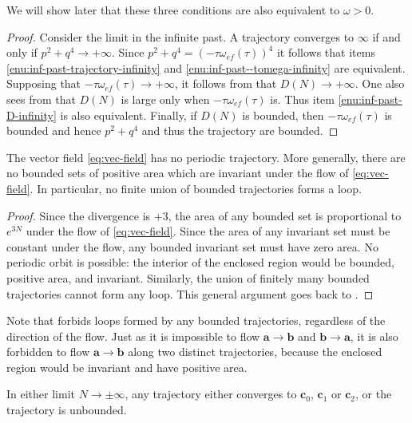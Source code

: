 We will show later that these three conditions are also equivalent to $\omega>0$. 
\begin{proof}
Consider the limit in the infinite past. A trajectory converges to $\bm{\infty}$ if and only if $p^{2}+q^{4}\to+\infty$. Since $p^{2}+q^{4}=(-\tau\omega_{ef}(\tau))^{4}$ it follows that items \ref{enu:inf-past-trajectory-infinity} and \ref{enu:inf-past--tomega-infinity} are equivalent. Supposing that $-\tau\omega_{ef}(\tau)\to+\infty$, it follows from  that $D(N)\to+\infty$. One also sees from  that $D(N)$ is large only when $-\tau\omega_{ef}(\tau)$ is. Thus item \ref{enu:inf-past-D-infinity} is also equivalent. Finally, if $D(N)$ is bounded, then $-\tau\omega_{ef}(\tau)$ is bounded and hence $p^{2}+q^{4}$ and thus the trajectory are bounded.
\end{proof}
\begin{lem}
\label{lem:Bendixson-criterion}The vector field \eqref{eq:vec-field} has no periodic trajectory. More generally, there are no bounded sets of positive area which are invariant under the flow of \eqref{eq:vec-field}. In particular, no finite union of bounded trajectories forms a loop.
\end{lem}

\begin{proof}
Since the divergence is $+3$, the area of any bounded set is proportional to $e^{3N}$ under the flow of \eqref{eq:vec-field}. Since the area of any invariant set must be constant under the flow, any bounded invariant set must have zero area. No periodic orbit is possible: the interior of the enclosed region would be bounded, positive area, and invariant. Similarly, the union of finitely many bounded trajectories cannot form any loop. This general argument goes back to \cite{bendixson1901}. 
\end{proof}
Note that  forbids loops formed by any bounded trajectories, regardless of the direction of the flow. Just as it is impossible to flow $\mathbf{a}\to\mathbf{b}$ and $\mathbf{b}\to\mathbf{a}$, it is also forbidden to flow $\mathbf{a}\to\mathbf{b}$ along two distinct trajectories, because the enclosed region would be invariant and have positive area. 
\begin{lem}
\label{lem:Poincare-Bendixson} In either limit $N\to\pm\infty$, any trajectory either converges to $\mathbf{c}_{0}$, $\mathbf{c}_{1}$ or $\mathbf{c}_{2}$, or the trajectory is unbounded. 
\end{lem}


